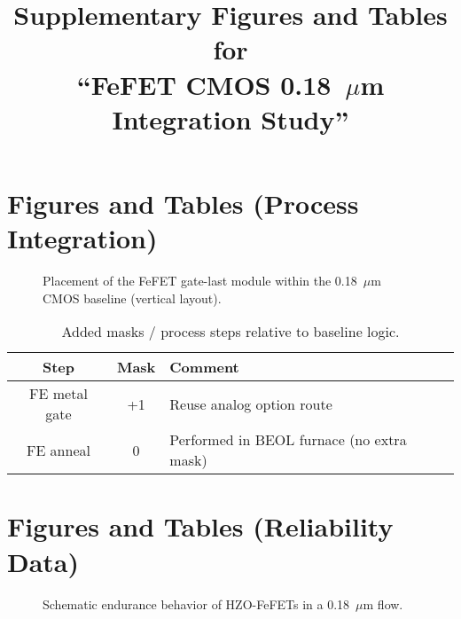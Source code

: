 \documentclass[conference]{IEEEtran}
\begin{document}
\title{\Large\bfseries Supplementary Figures and Tables for\\
``FeFET CMOS 0.18~$\mu$m Integration Study''}
\author{}
\maketitle

\section*{Figures and Tables (Process Integration)}

\begin{figure}[!t]
\centering
\caption{Placement of the FeFET gate-last module within the 0.18~$\mu$m CMOS baseline (vertical layout).}
\end{figure}

\vspace{8pt}

\begin{table}[!t]
\centering
\caption{Added masks / process steps relative to baseline logic.}
\begin{tabular}{|c|c|l|}\hline
Step & Mask & Comment\\ \hline
FE metal gate & +1 & Reuse analog option route\\
FE anneal     & 0  & Performed in BEOL furnace (no extra mask)\\ \hline
\end{tabular}
\end{table}

\newpage

\section*{Figures and Tables (Reliability Data)}

\begin{figure}[!t]
\centering
{}
\caption{Schematic endurance behavior of HZO-FeFETs in a 0.18~$\mu$m flow.}
\end{figure}
\end{document}
